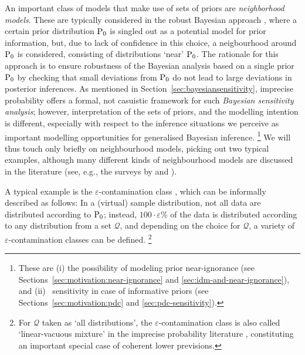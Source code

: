 An important class of models that make use of sets of priors are \emph{neighborhood models}.
These are typically considered in the robust Bayesian approach \parencite[see, e.g.,][]{1994:berger,2000:rios},
where a certain prior distribution $\operatorname{P}_0$ is singled out as a potential model for prior information,
but, due to lack of confidence in this choice, a neigbourhood around $\operatorname{P}_0$ is considered,
consisting of distributions `near' $\operatorname{P}_0$.
The rationale for this approach is to ensure robustness of the Bayesian analysis based on a single prior $\operatorname{P}_0$
by checking that small deviations from $\operatorname{P}_0$ do not lead to large deviations in posterior inferences.
As mentioned in Section~\ref{sec:bayesiansensitivity},
imprecise probability offers a formal, not casuistic framework for such \emph{Bayesian sensitivity analysis};
however, interpretation of the sets of priors, and the modelling intention is different,
especially with respect to the inference situations we perceive as important modelling opportunities
for generalised Bayesian inference.%
\footnote{These are (i) the possibility of modeling prior near-ignorance
(see Sections~\ref{sec:motivation:near-ignorance} and \ref{sec:idm-and-near-ignorance}),
and (ii) \pdc\ sensitivity in case of informative priors
(see Sections~\ref{sec:motivation:pdc} and \ref{sec:pdc-sensitivity}).}
We will thus touch only briefly on neighbourhood models,
picking out two typical examples,
although many different kinds of neighbourhood models are discussed in the literature
(see, e.g., the surveys by \textcite{2000:bergerinsuaruggeri} and \textcite{2005:ruggeri}).

A typical example is the $\varepsilon$-contamination class \parencite[see, e.g.,][\S 4.3.2]{1994:berger},
which can be informally described as follows:
In a (virtual) sample distribution,
not all data are distributed according to $\operatorname{P}_0$;
instead, %
$100\cdot\varepsilon$\% of the data is distributed according to any distribution from a set $\mathcal{Q}$, %
and depending on the choice for $\mathcal{Q}$, %
a variety of $\varepsilon$-contamination classes can be defined.%
\footnote{For $\mathcal{Q}$ taken as `all distributions',
the $\varepsilon$-contamination class is also called `linear-vacuous mixture'
in the imprecise probability literature \parencite[e.g.,][\S 7.3]{itip-special},
constituting an important special case of coherent lower previsions.}

